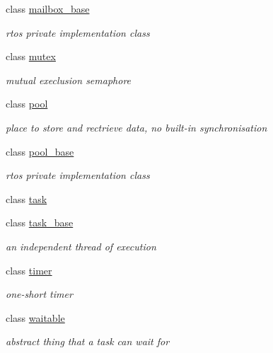 \begin{DoxyCompactItemize}
class \hyperlink{classrtos_1_1mailbox__base}{mailbox\+\_\+base}
\begin{DoxyCompactList}\small\item\em rtos private implementation class \end{DoxyCompactList}\item 
class \hyperlink{classrtos_1_1mutex}{mutex}
\begin{DoxyCompactList}\small\item\em mutual execlusion semaphore \end{DoxyCompactList}\item 
class \hyperlink{classrtos_1_1pool}{pool}
\begin{DoxyCompactList}\small\item\em place to store and rectrieve data, no built-\/in synchronisation \end{DoxyCompactList}\item 
class \hyperlink{classrtos_1_1pool__base}{pool\+\_\+base}
\begin{DoxyCompactList}\small\item\em rtos private implementation class \end{DoxyCompactList}\item 
class \hyperlink{classrtos_1_1task}{task}
\item 
class \hyperlink{classrtos_1_1task__base}{task\+\_\+base}
\begin{DoxyCompactList}\small\item\em an independent thread of execution \end{DoxyCompactList}\item 
class \hyperlink{classrtos_1_1timer}{timer}
\begin{DoxyCompactList}\small\item\em one-\/short timer \end{DoxyCompactList}\item 
class \hyperlink{classrtos_1_1waitable}{waitable}
\begin{DoxyCompactList}\small\item\em abstract thing that a task can wait for \end{DoxyCompactList}\end{DoxyCompactItemize}
